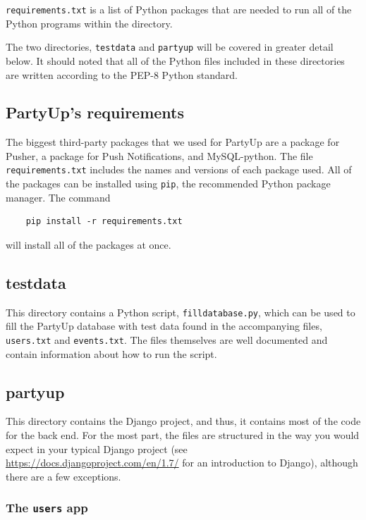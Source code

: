 \documentclass[12pt]{article}
\begin{document}
\texttt{requirements.txt} is a list of Python packages that are needed to
run all of the Python programs within the directory.

The two directories, \texttt{testdata} and \texttt{partyup} will be covered
in greater detail below.
It should noted that all of the Python files included in these directories
are written according to the PEP-8 Python standard.

\subsection{PartyUp's requirements}

The biggest third-party packages that we used for PartyUp are a package for Pusher, a package for Push Notifications, and MySQL-python. 
The file \texttt{requirements.txt} includes the names and versions of each package used.
All of the packages can be installed using \texttt{pip}, the recommended
Python package manager.
The command
\begin{lstlisting}
    pip install -r requirements.txt
\end{lstlisting}
will install all of the packages at once.

\subsection{testdata}

This directory contains a Python script, \texttt{filldatabase.py},
which can be used to fill the PartyUp database with test data
found in the accompanying files, \texttt{users.txt} and \texttt{events.txt}.
The files themselves are well documented and contain information about
how to run the script.

\subsection{partyup}

This directory contains the Django project, and thus,
it contains most of the code for the back end.
For the most part, the files are structured in the way you would
expect in your typical Django project
(see \url{https://docs.djangoproject.com/en/1.7/} for an introduction to Django),
although there are a few exceptions.

\subsubsection{The \texttt{users} app}
\end{document}

